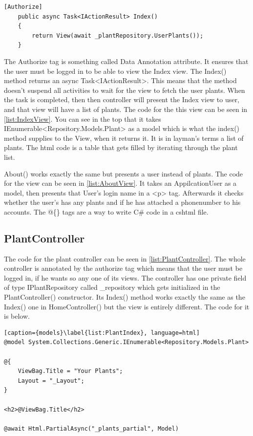 \documentclass[a4paper,12pt,twoside,openright,titlepage]{book}
\begin{document}
\begin{center}
\begin{lstlisting}[caption={Dependency Injection}, language=CSharp]
	[Authorize]
    public async Task<IActionResult> Index()
	{            
        return View(await _plantRepository.UserPlants());
	}
\end{lstlisting}
\end{center} 
The Authorize tag is something called Data Annotation attribute. It ensures that the user must be logged in to be able to view the Index view. The Index() method returns an async Task<IActionResult>. This means that the method doesn't suspend all activities to wait for the view to fetch the user plants. When the task is completed, then then controller will present the Index view to user, and that view will have a list of plants. The code for the this view can be seen in \ref{list:IndexView}. You can see in the top that it takes IEnumerable<Repository.Models.Plant> as a model which is what the index() method supplies to the View, when it returns it. It is in layman's terms a list of plants. The html code is a table that gets filled by iterating through the plant list.

About() works exactly the same but presents a user instead of plants. The code for the view can be seen in \ref{list:AboutView}. It takes an AppilcationUser as a model, then presents that User's login name in a <p> tag. Afterwards it checks whether the user's has any plants and if he has attached a phonenumber to his accounts. The @\{\} tags are a way to write C\# code in a cshtml file.


\subsection{PlantController}
The code for the plant controller can be seen in \ref{list:PlantController}. The whole controller is annotated by the authorize tag which means that the user must be logged in, if he wants so any one of its views. The controller has one private field of type IPlantRepository called \_repository which gets initialized in the PlantController() constructor. Its Index() method works exactly the same as the Index() one in HomeController() but the view is entirely different. The code for it is below.

\begin{center}
\begin{lstlisting}[caption={models}\label{list:PlantIndex}, language=html]
@model System.Collections.Generic.IEnumerable<Repository.Models.Plant>

@{
    ViewBag.Title = "Your Plants";
    Layout = "_Layout";
}

<h2>@ViewBag.Title</h2>

@await Html.PartialAsync("_plants_partial", Model)
\end{lstlisting}
\end{center} 
\end{document}
